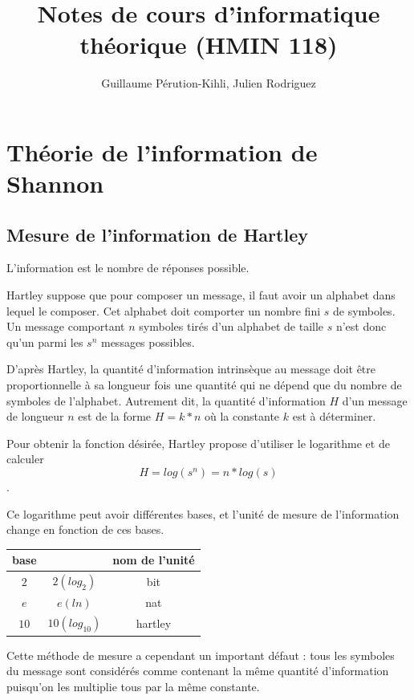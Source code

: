 \documentclass[10pt,a4paper]{article}
\title{Notes de cours d'informatique théorique (HMIN 118)}
\author{Guillaume Pérution-Kihli, Julien Rodriguez}
\theoremstyle{definition}
\numberwithin{lemma}{subsection}
\numberwithin{theorem}{subsection}
\numberwithin{definition}{subsection}
\numberwithin{proposition}{subsection}
\numberwithin{corollary}{subsection}
\numberwithin{property}{subsection}
\numberwithin{example}{subsection}
\numberwithin{heuristique}{subsection}
\numberwithin{scenario}{subsection}
\begin{document}
\maketitle
\renewcommand{\contentsname}{Sommaire}
\tableofcontents
\pagebreak

\section{Théorie de l'information de Shannon}
	\subsection{Mesure de l'information de Hartley}
	
L'information est le nombre de réponses possible.
\par Hartley suppose que pour composer un message, il faut avoir un alphabet dans lequel le composer. Cet alphabet doit comporter un nombre fini $s$ de symboles. Un message comportant $n$ symboles tirés d'un alphabet de taille $s$ n'est donc qu'un parmi les $s^n$ messages possibles.
\par D'après Hartley, la quantité d'information intrinsèque au message doit être proportionnelle à sa longueur fois une quantité qui ne dépend que du nombre de symboles de l'alphabet. Autrement dit, la quantité d'information $H$ d'un message de longueur $n$ est de la forme $H = k * n$ où la constante $k$ est à déterminer.
\par Pour obtenir la fonction désirée, Hartley propose d'utiliser le logarithme et de calculer $$H = log(s^n) = n*log(s) $$.
\par Ce logarithme peut avoir différentes bases, et l'unité de mesure de l'information change en fonction de ces bases.
\par
\begin{center}
\begin{tabular}{|c|c|c|}
\hline
base &  & nom de l'unité \\
\hline
$2$ & $2 (log_2)$ & bit \\
\hline
$e$ & $e (ln)$ & nat \\
\hline
$10$ & $10(log_{10})$ & hartley \\
\hline
\end{tabular}
\end{center}

\par Cette méthode de mesure a cependant un important défaut : tous les symboles du message sont considérés comme contenant la même quantité d'information puisqu'on les multiplie tous par la même constante.
\end{document}
